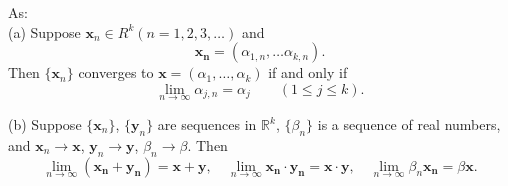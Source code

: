 \begin{thm} As:\\
    \label{thm:3.4}
    (a) Suppose $\mathbf{x}_n \in R^k (n = 1,2,3,\dots)$ and
    \begin{equation*}
        \mathbf{x_n} = (
            \alpha_{1,n},\dots
            \alpha_{k,n}
        ).
    \end{equation*}
    Then $\{\mathbf{x}_n\}$ converges to $\mathbf{x} = (\alpha_1, \dots, \alpha_k)$ if and only if
    \begin{equation}
        \lim_{n \to \infty} \alpha_{j,n} = \alpha_j \qquad (1\leq j\leq k).
    \end{equation}

    (b) Suppose $\{\mathbf{x}_n\}$, $\{\mathbf{y}_n\}$ are sequences in $\mathbb{R}^k$, $\{\beta_n\}$ is a sequence of real numbers, and 
    $\mathbf{x}_n \rightarrow \mathbf{x}$,
    $\mathbf{y}_n \rightarrow \mathbf{y}$,
    $\beta_n \rightarrow \beta$. Then
    \begin{equation*}
        \lim_{n \to \infty} (\mathbf{x_n} + \mathbf{y_n}) = \mathbf{x} + \mathbf{y}, \quad
        \lim_{n \to \infty} \mathbf{x_n} \cdot \mathbf{y_n} = \mathbf{x} \cdot \mathbf{y}, \quad
        \lim_{n \to \infty} \beta_n \mathbf{x_n} = \beta \mathbf{x}.
    \end{equation*}
\end{thm}
